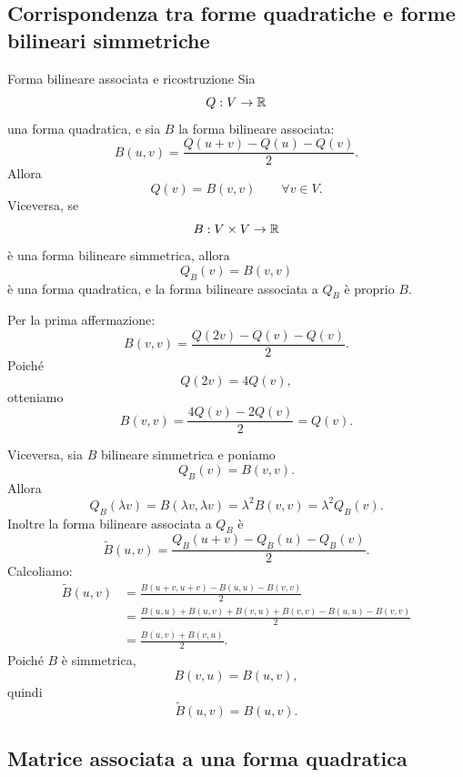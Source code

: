 \documentclass[a4paper]{article}
\begin{document}
\subsection{Corrispondenza tra forme quadratiche e forme bilineari simmetriche}

\begin{snippetproposition}{Forma bilineare associata e ricostruzione}
    Sia
    \[
        Q:V\to\mathbb{R}
    \]
    una forma quadratica, e sia \(B\) la forma bilineare associata:
    \[
        B(u,v)=\frac{Q(u+v)-Q(u)-Q(v)}{2}.
    \]
    Allora
    \[
        Q(v)=B(v,v)
        \qquad
        \forall v\in V.
    \]
    Viceversa, se
    \[
        B:V\times V\to\mathbb{R}
    \]
    è una forma bilineare simmetrica, allora
    \[
        Q_B(v)=B(v,v)
    \]
    è una forma quadratica, e la forma bilineare associata a \(Q_B\) è proprio \(B\).
\end{snippetproposition}

\begin{snippetproof}{}
    Per la prima affermazione:
    \[
        B(v,v)
        =
        \frac{Q(2v)-Q(v)-Q(v)}{2}.
    \]
    Poiché
    \[
        Q(2v)=4Q(v),
    \]
    otteniamo
    \[
        B(v,v)=\frac{4Q(v)-2Q(v)}{2}=Q(v).
    \]

    Viceversa, sia \(B\) bilineare simmetrica e poniamo
    \[
        Q_B(v)=B(v,v).
    \]
    Allora
    \[
        Q_B(\lambda v)
        =
        B(\lambda v,\lambda v)
        =
        \lambda^2B(v,v)
        =
        \lambda^2Q_B(v).
    \]
    Inoltre la forma bilineare associata a \(Q_B\) è
    \[
        \widetilde{B}(u,v)
        =
        \frac{Q_B(u+v)-Q_B(u)-Q_B(v)}{2}.
    \]
    Calcoliamo:
    \begin{align*}
        \widetilde{B}(u,v)
        &=
        \frac{
            B(u+v,u+v)-B(u,u)-B(v,v)
        }{2}\\
        &=
        \frac{
            B(u,u)+B(u,v)+B(v,u)+B(v,v)
            -B(u,u)-B(v,v)
        }{2}\\
        &=
        \frac{B(u,v)+B(v,u)}{2}.
    \end{align*}
    Poiché \(B\) è simmetrica,
    \[
        B(v,u)=B(u,v),
    \]
    quindi
    \[
        \widetilde{B}(u,v)=B(u,v).
    \]
\end{snippetproof}

\subsection{Matrice associata a una forma quadratica}
\end{document}
